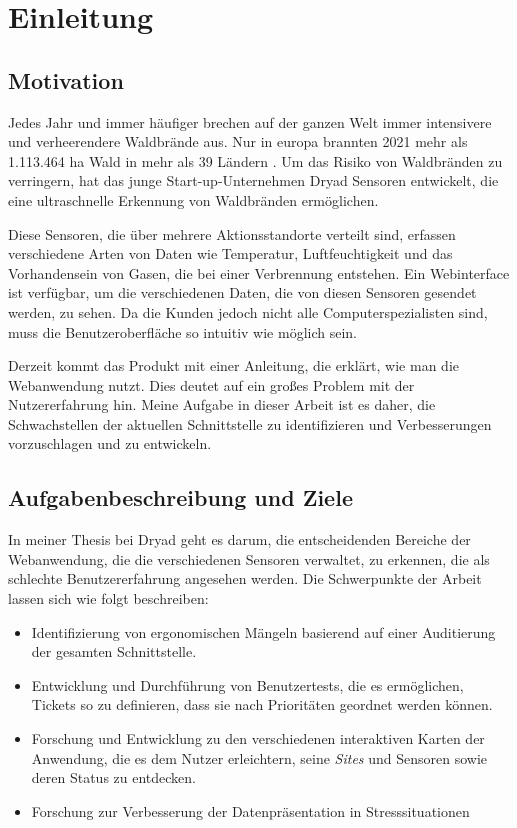 \chapter{Einleitung}

\section{Motivation}

Jedes Jahr und immer häufiger brechen auf der ganzen Welt immer intensivere und verheerendere Waldbrände aus.
Nur in europa brannten 2021 mehr als 1.113.464 ha Wald in mehr als 39 Ländern \cite{JRC}.
Um das Risiko von Waldbränden zu verringern, hat das junge Start-up-Unternehmen Dryad Sensoren entwickelt, die eine ultraschnelle Erkennung von Waldbränden ermöglichen.

Diese Sensoren, die über mehrere Aktionsstandorte verteilt sind, erfassen verschiedene Arten von Daten wie Temperatur, Luftfeuchtigkeit und das Vorhandensein von Gasen, die bei einer Verbrennung entstehen.
Ein Webinterface ist verfügbar, um die verschiedenen Daten, die von diesen Sensoren gesendet werden, zu sehen.
Da die Kunden jedoch nicht alle Computerspezialisten sind, muss die Benutzeroberfläche so intuitiv wie möglich sein.

Derzeit kommt das Produkt mit einer Anleitung, die erklärt, wie man die Webanwendung nutzt. Dies deutet auf ein großes Problem mit der Nutzererfahrung hin.
Meine Aufgabe in dieser Arbeit ist es daher, die Schwachstellen der aktuellen Schnittstelle zu identifizieren und Verbesserungen vorzuschlagen und zu entwickeln.

\section{Aufgabenbeschreibung und Ziele} \label{sec:targets}

In meiner Thesis bei Dryad geht es darum, die entscheidenden Bereiche der Webanwendung, die die verschiedenen Sensoren verwaltet, zu erkennen, die als schlechte Benutzererfahrung angesehen werden.
Die Schwerpunkte der Arbeit lassen sich wie folgt beschreiben:

\begin{itemize}
  \item Identifizierung von ergonomischen Mängeln basierend auf einer Auditierung der gesamten Schnittstelle.
  \item Entwicklung und Durchführung von Benutzertests, die es ermöglichen, Tickets so zu definieren, dass sie nach Prioritäten geordnet werden können.
  \item Forschung und Entwicklung zu den verschiedenen interaktiven Karten der Anwendung, die es dem Nutzer erleichtern, seine \textit{Sites} und Sensoren sowie deren Status zu entdecken.
  \item Forschung zur Verbesserung der Datenpräsentation in Stresssituationen
\end{itemize}

